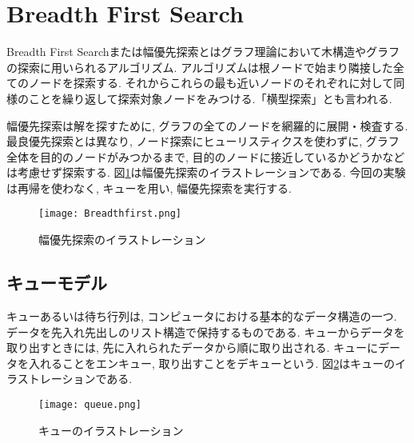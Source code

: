 \documentclass[a4j, titlepage]{jarticle}
\begin{document}
\section{Breadth First Search}
Breadth First Searchまたは幅優先探索とはグラフ理論において木構造やグラフの探索に用いられるアルゴリズム. アルゴリズムは根ノードで始まり隣接した全てのノードを探索する. それからこれらの最も近いノードのそれぞれに対して同様のことを繰り返して探索対象ノードをみつける.「横型探索」とも言われる\cite{bfs:setsumei}.

幅優先探索は解を探すために, グラフの全てのノードを網羅的に展開・検査する. 最良優先探索とは異なり, ノード探索にヒューリスティクスを使わずに, グラフ全体を目的のノードがみつかるまで, 目的のノードに接近しているかどうかなどは考慮せず探索する\cite{bfs:setsumei}. 図\ref{pic:habairasuto}は幅優先探索のイラストレーションである. 今回の実験は再帰を使わなく, キューを用い, 幅優先探索を実行する.

\begin{figure}[tbh]
    \centering \texttt{[image: Breadthfirst.png]}
    \caption{幅優先探索のイラストレーション}
    \label{pic:habairasuto}
\end{figure}
\pagebreak
\subsection{キューモデル}
キューあるいは待ち行列は, コンピュータにおける基本的なデータ構造の一つ. データを先入れ先出しのリスト構造で保持するものである. キューからデータを取り出すときには, 先に入れられたデータから順に取り出される. キューにデータを入れることをエンキュー, 取り出すことをデキューという\cite{kyu}. 図\ref{pic:queueirasuto}はキューのイラストレーションである. 

\begin{figure}[tbh]
    \centering \texttt{[image: queue.png]}
    \caption{キューのイラストレーション}
    \label{pic:queueirasuto}
\end{figure}
\end{document}
